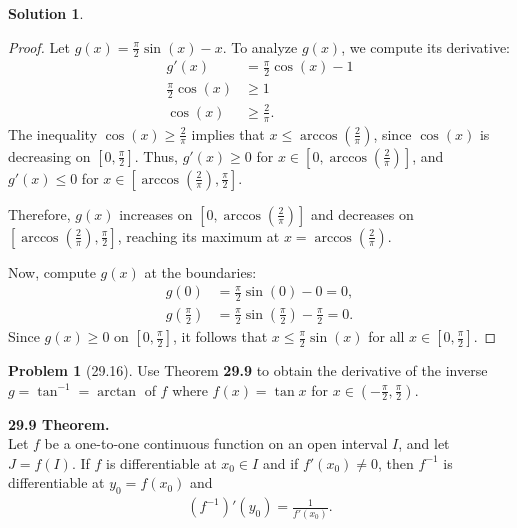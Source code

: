 \documentclass[12pt]{article}
\theoremstyle{definition} %
\newtheorem{solution}{Solution}
\newtheorem{problem}{Problem}
\theoremstyle{plain} %
\begin{document}
\begin{solution}
\begin{enumerate}
    \begin{proof}
        Let $g(x) = \frac{\pi}{2}\sin(x) - x$. To analyze $g(x)$, we compute its derivative:
        \begin{align}
            g'(x) &= \frac{\pi}{2}\cos(x) - 1 \\[10pt] 
            \frac{\pi}{2}\cos(x) &\geq 1 \\[10pt] 
            \cos(x) &\geq \frac{2}{\pi}.
        \end{align}
        The inequality $\cos(x) \geq \frac{2}{\pi}$ implies that $x \leq \arccos\left(\frac{2}{\pi}\right)$, since $\cos(x)$ is decreasing on $[0, \frac{\pi}{2}]$. Thus, $g'(x) \geq 0$ for $x \in [0, \arccos\left(\frac{2}{\pi}\right)]$, and $g'(x) \leq 0$ for $x \in [\arccos\left(\frac{2}{\pi}\right), \frac{\pi}{2}]$. 
    
        Therefore, $g(x)$ increases on $[0, \arccos\left(\frac{2}{\pi}\right)]$ and decreases on $[\arccos\left(\frac{2}{\pi}\right), \frac{\pi}{2}]$, reaching its maximum at $x = \arccos\left(\frac{2}{\pi}\right)$.
    
        Now, compute $g(x)$ at the boundaries:
        \begin{align}
            g(0) &= \frac{\pi}{2}\sin(0) - 0 = 0, \\[10pt]
            g\left(\frac{\pi}{2}\right) &= \frac{\pi}{2}\sin\left(\frac{\pi}{2}\right) - \frac{\pi}{2} = 0.
        \end{align}
        Since $g(x) \geq 0$ on $[0, \frac{\pi}{2}]$, it follows that $x \leq \frac{\pi}{2}\sin(x)$ for all $x \in [0, \frac{\pi}{2}]$.
    \end{proof}
\end{enumerate}
\end{solution}
\begin{problem}[29.16]
    Use Theorem \textbf{29.9} to obtain the derivative of the inverse $ g = \tan^{-1} = \arctan $ of $ f $ where $ f(x) = \tan x $ for $ x \in \left( -\frac{\pi}{2}, \frac{\pi}{2} \right) $.

\bigskip

\textbf{29.9 Theorem.} \\
Let $ f $ be a one-to-one continuous function on an open interval $ I $, and let $ J = f(I) $. If $ f $ is differentiable at $ x_0 \in I $ and if $ f'(x_0) \neq 0 $, then $ f^{-1} $ is differentiable at $ y_0 = f(x_0) $ and
\begin{align}    
(f^{-1})'(y_0) = \frac{1}{f'(x_0)}.
\end{align}
\end{problem}
\end{document}

